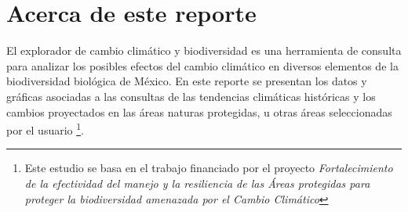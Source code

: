 \documentclass{article}
\begin{document}
	
	\tableofcontents
	\section*{Acerca de este reporte}
	El explorador de cambio clim\'atico y biodiversidad es una herramienta de consulta para analizar los posibles efectos del cambio clim\'atico en diversos elementos de la biodiversidad biol\'ogica de M\'exico. En este reporte se presentan los datos y gr\'aficas asociadas a las consultas de las tendencias clim\'aticas hist\'oricas y los cambios proyectados en las \'areas naturas protegidas, u otras \'areas seleccionadas por el usuario \footnote{Este estudio se basa en el trabajo financiado por el proyecto \emph{Fortalecimiento de la efectividad del manejo y la resiliencia de las \'Areas protegidas para proteger la biodiversidad amenazada por el Cambio Clim\'atico}}.
	\newpage








\end{document}
